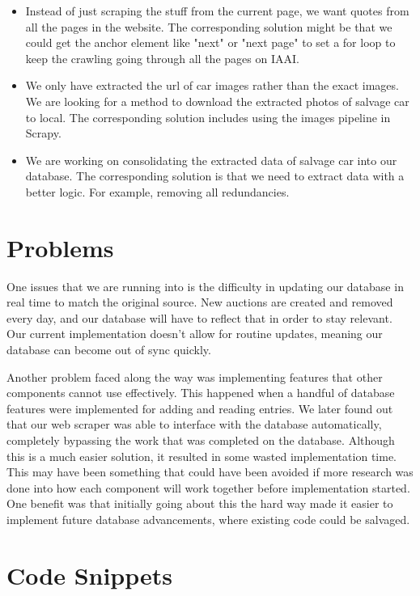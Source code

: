 \documentclass[onecolumn, draftclsnofoot,10pt, compsoc]{IEEEtran}
\begin{document}
\begin{itemize}
\item Instead of just scraping the stuff from the current page, we want quotes from all the pages in the website. The corresponding solution might be that we could get the anchor element like "next" or "next page" to set a for loop to keep the crawling going through all the pages on IAAI. 
\item We only have extracted the url of car images rather than the exact images. We are looking for a method to download the extracted photos of salvage car to local. The corresponding solution includes using the images pipeline in Scrapy.
\item We are working on consolidating the extracted data of salvage car into our database. The corresponding solution is that we need to extract data with a better logic. For example, removing all redundancies. 

\end{itemize}

\section{Problems}
One issues that we are running into is the difficulty in updating our database in real time to match the original source. New auctions are created and removed every day, and our database will have to reflect that in order to stay relevant. Our current implementation doesn't allow for routine updates, meaning our database can become out of sync quickly. 

Another problem faced along the way was implementing features that other components cannot use effectively. This happened when a handful of database features were implemented for adding and reading entries. We later found out that our web scraper was able to interface with the database automatically, completely bypassing the work that was completed on the database. Although this is a much easier solution, it resulted in some wasted implementation time. This may have been something that could have been avoided if more research was done into how each component will work together before implementation started. One benefit was that initially going about this the hard way made it easier to implement future database advancements, where existing code could be salvaged. 


\section{Code Snippets}
\end{document}
